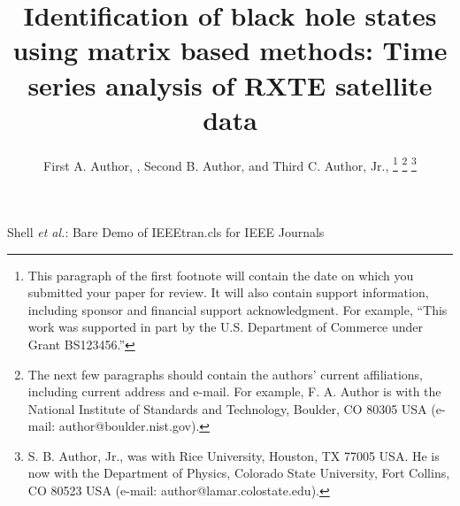 \documentclass[journal]{IEEEtran}
\begin{document}
\title{Identification of black hole states  using matrix based methods: Time series analysis of RXTE satellite data}

\author{First A. Author, , Second B. Author, and Third C. Author, Jr., 
\thanks{This paragraph of the first footnote will contain the date on which you submitted your paper for review. It will also contain support information, including sponsor and financial support acknowledgment. For example, ``This work was supported in part by the U.S. Department of Commerce under Grant BS123456.'' }
\thanks{The next few paragraphs should contain the authors' current affiliations, including current address and e-mail. For example, F. A. Author is with the National Institute of Standards and Technology, Boulder, CO 80305 USA (e-mail: author@boulder.nist.gov).}
\thanks{S. B. Author, Jr., was with Rice University, Houston, TX 77005 USA. He is now with the Department of Physics, Colorado State University, Fort Collins, CO 80523 USA (e-mail: author@lamar.colostate.edu).}}

{Shell \MakeLowercase{\textit{et al.}}: Bare Demo of IEEEtran.cls for IEEE Journals}
\maketitle
\end{document}
